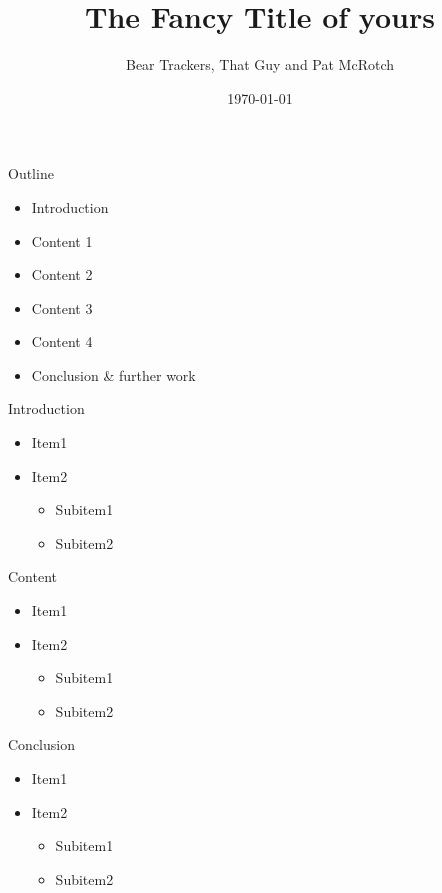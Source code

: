 \documentclass[a4paper]{beamer}
\title[title]{The Fancy Title of yours}
\author[Cool People]{Bear Trackers, That Guy and Pat McRotch}
\date{\today}
\begin{document}
%
\begin{frame}
	\maketitle
\end{frame}

\begin{frame}{Outline}
	\begin{itemize}
		\item Introduction
		\vfill
		\item Content 1
		\vfill
		\item Content 2
		\vfill
		\item Content 3
		\vfill
		\item Content 4
		\vfill
		\item Conclusion \& further work
		\vfill
	\end{itemize}
\end{frame}

\begin{frame}{Introduction}
	\begin{itemize}
		\item Item1
		\item Item2
			\begin{itemize}
				\item Subitem1
				\item Subitem2
			\end{itemize}
	\end{itemize}
\end{frame}

\begin{frame}{Content}
	\begin{itemize}
		\item Item1
		\item Item2
			\begin{itemize}
				\item Subitem1
				\item Subitem2
			\end{itemize}
	\end{itemize}
\end{frame}

\begin{frame}{Conclusion}
	\begin{itemize}
		\item Item1
		\item Item2
			\begin{itemize}
				\item Subitem1
				\item Subitem2
			\end{itemize}
	\end{itemize}
\end{frame}

\begin{frame}
	\maketitle
\end{frame}
\end{document}
